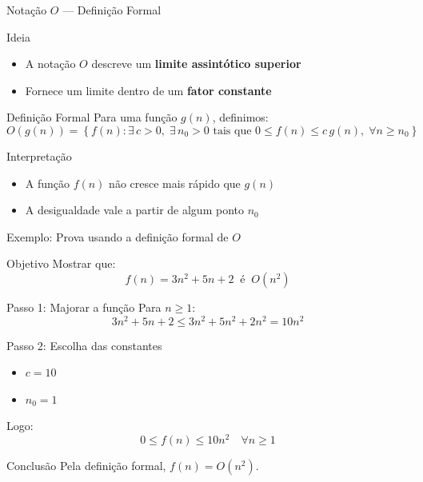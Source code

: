 \documentclass{beamer}
\begin{document}
\begin{frame}{Notação $O$ — Definição Formal}

\begin{block}{Ideia}
\begin{itemize}
    \item A notação $O$ descreve um \textbf{limite assintótico superior}
    \item Fornece um limite dentro de um \textbf{fator constante}
\end{itemize}
\end{block}

\vspace{0.2cm}

\begin{block}{Definição Formal}
Para uma função $g(n)$, definimos:
\small
\[
O(g(n)) = \left \{ f(n) : \exists\, c > 0,\; \exists\, n_0 > 0 \text{ tais que } 0 \leq f(n) \leq c\,g(n),\; \forall n \geq n_0 \right \} 
\]
\end{block}
\normalsize
\vspace{0.2cm}

\begin{alertblock}{Interpretação}
\begin{itemize}
    \item A função $f(n)$ não cresce mais rápido que $g(n)$
    \item A desigualdade vale a partir de algum ponto $n_0$
\end{itemize}
\end{alertblock}

\end{frame}
\begin{frame}{Exemplo: Prova usando a definição formal de $O$}
\small
\begin{block}{Objetivo}
Mostrar que:
\[
f(n) = 3n^2 + 5n + 2 \;\;\text{é}\;\; O(n^2)
\]
\end{block}

\vspace{0.2cm}

\begin{block}{Passo 1: Majorar a função}
Para $n \geq 1$:
\[
3n^2 + 5n + 2 \leq 3n^2 + 5n^2 + 2n^2 = 10n^2
\]
\end{block}

\vspace{0.2cm}

\begin{block}{Passo 2: Escolha das constantes}
\begin{itemize}
    \item $c = 10$
    \item $n_0 = 1$
\end{itemize}

Logo:
\[
0 \leq f(n) \leq 10n^2 \quad \forall n \geq 1
\]
\end{block}

\vspace{0.2cm}

\begin{alertblock}{Conclusão}
Pela definição formal, $f(n) = O(n^2)$.
\end{alertblock}

\end{frame}
\end{document}
